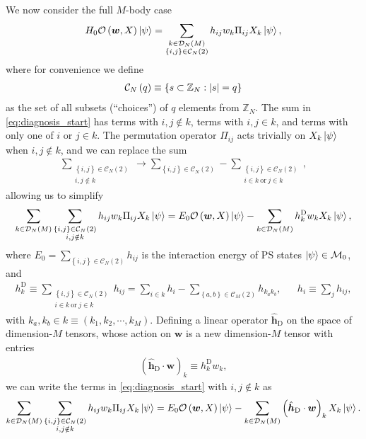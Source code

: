 \documentclass[nofootinbib,notitlepage,11pt]{revtex4-2}
\renewcommand{\t}{\text} %
\newcommand{\p}[1]{\left(#1\right)} %
\renewcommand{\set}[1]{\left\{#1\right\}} %
\renewcommand{\c}{\cdot} %
\newcommand{\m}{\bm} %
\newcommand{\1}{\mathds{1}}
\renewcommand{\i}{\mathrm{i}\mkern1mu}
\newcommand{\C}{\mathcal{C}}
\newcommand{\D}{\mathcal{D}}
\newcommand{\M}{\mathcal{M}}
\renewcommand{\O}{\mathcal{O}}
\newcommand{\ZZ}{\mathbb{Z}}
\begin{document}
We now consider the full $M$-body case
\begin{align}
  H_0 \O\p{\m w,X} \ket\psi
  = \sum_{\substack{k\in\D_N\p{M}\\\set{i,j}\in\C_N\p{2}}}
  h_{ij} w_k \Pi_{ij} X_k \ket\psi,
  \label{eq:diagnosis_start}
\end{align}
where for convenience we define
\begin{align}
  \C_N\p{q} \equiv \set{ s \subset \ZZ_N : \abs{s} = q }
  \label{eq:choices}
\end{align}
as the set of all subsets (``choices'') of $q$ elements from $\ZZ_N$.
The sum in \eqref{eq:diagnosis_start} has terms with $i,j\notin k$, terms with $i,j\in k$, and terms with only one of $i$ or $j\in k$.
The permutation operator $\Pi_{ij}$ acts trivially on $X_k\ket\psi$ when $i,j\notin k$, and we can replace the sum
\begin{align}
  \sum_{\substack{\set{i,j}\in\C_N\p{2}\\i,j\notin k}}
  \to \sum_{\set{i,j}\in\C_N\p{2}}
  - \sum_{\substack{\set{i,j}\in\C_N\p{2}\\i\in k~\t{or}~j\in k}},
\end{align}
allowing us to simplify
\begin{align}
  \sum_{k\in\D_N\p{M}} \sum_{\substack{\set{i,j}\in\C_N\p{2}\\i,j\notin k}}
  h_{ij} w_k \Pi_{ij} X_k \ket\psi
  = E_0 \O\p{\m w,X} \ket\psi
  - \sum_{k\in\D_N\p{M}} h^{\t{D}}_k w_k X_k \ket\psi,
\end{align}
where $E_0 = \sum_{\set{i,j}\in\C_N\p{2}} h_{ij}$ is the interaction energy of PS states $\ket\psi\in\M_0$, and
\begin{align}
  h^{\t{D}}_k \equiv
  \sum_{\substack{\set{i,j}\in\C_N\p{2}\\i\in k~\t{or}~j\in k}} h_{ij}
  = \sum_{i\in k} h_i - \sum_{\set{a,b}\in\C_M\p{2}} h_{k_ak_b},
  &&
  h_i \equiv \sum_j h_{ij},
  \label{eq:multi_body_op_diag_element}
\end{align}
with $k_a,k_b\in k\equiv\p{k_1,k_2,\cdots,k_M}$.
Defining a linear operator $\hat{\m h}_{\t{D}}$ on the space of dimension-$M$ tensors, whose action on $\m w$ is a new dimension-$M$ tensor with entries
\begin{align}
  \p{\hat{\m h}_{\t{D}}\c\m w}_k \equiv h^{\t{D}}_k w_k,
  \label{eq:multi_body_op_diag}
\end{align}
we can write the terms in \eqref{eq:diagnosis_start} with $i,j\notin k$ as
\begin{align}
  \sum_{k\in\D_N\p{M}} \sum_{\substack{\set{i,j}\in\C_N\p{2}\\i,j\notin k}}
  h_{ij} w_k \Pi_{ij} X_k \ket\psi
  = E_0 \O\p{\m w,X} \ket\psi
  - \sum_{k\in\D_N\p{M}} \p{\hat{\m h}_{\t{D}}\c\m w}_k X_k \ket\psi.
\end{align}
\end{document}
